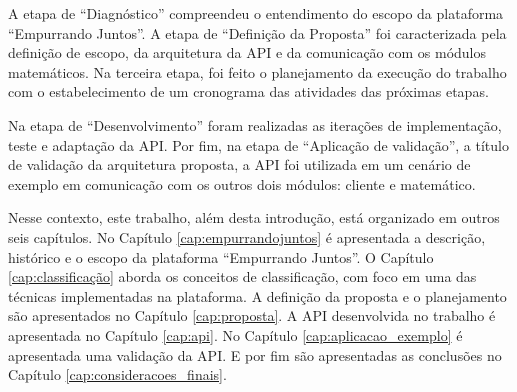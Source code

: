 A etapa de ``Diagnóstico'' compreendeu o entendimento do escopo da plataforma ``Empurrando Juntos''. 
A etapa de ``Definição da Proposta'' foi caracterizada pela definição de escopo, 
da arquitetura da API e da comunicação com os módulos matemáticos. Na terceira etapa, 
foi feito o planejamento da execução do trabalho com o estabelecimento
de um cronograma das atividades das próximas etapas. 

Na etapa de ``Desenvolvimento'' foram realizadas as iterações de implementação, teste e adaptação da API. 
Por fim, na etapa de ``Aplicação de validação'', a título de validação da arquitetura proposta,
a API foi utilizada em um cenário de exemplo em comunicação com os outros dois módulos: cliente e matemático.

Nesse contexto, este trabalho, além desta introdução, está organizado em outros seis capítulos.
No Capítulo \ref{cap:empurrandojuntos} é apresentada a descrição, histórico e o escopo da plataforma ``Empurrando Juntos''.
O Capítulo \ref{cap:classificação} aborda os conceitos de classificação, com foco em uma das técnicas implementadas na plataforma. 
A definição da proposta e o planejamento são apresentados no Capítulo \ref{cap:proposta}.
A API desenvolvida no trabalho é apresentada no Capítulo \ref{cap:api}. No Capítulo \ref{cap:aplicacao_exemplo} é
apresentada uma validação da API. E por fim são apresentadas as conclusões no Capítulo \ref{cap:consideracoes_finais}.
